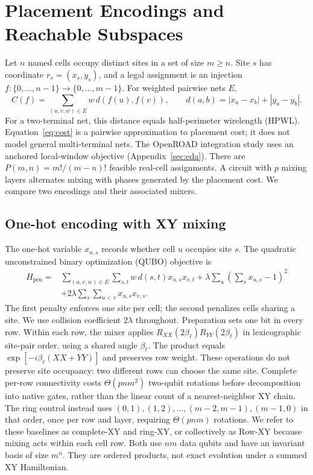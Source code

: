 \documentclass[manuscript,screen,review]{acmart}
\begin{document}
\section{Placement Encodings and Reachable Subspaces}
\label{sec:encoding}
Let $n$ named cells occupy distinct sites in a set of size $m\geq n$.
Site $s$ has coordinate $r_s=(x_s,y_s)$, and a legal assignment is an injection
$f:\{0,\ldots,n-1\}\to\{0,\ldots,m-1\}$. For weighted pairwise nets $E$,
\begin{equation}
 C(f)=\sum_{(u,v,w)\in E}w\,d(f(u),f(v)),\qquad
 d(a,b)=|x_a-x_b|+|y_a-y_b|.
 \label{eq:cost}
\end{equation}
For a two-terminal net, this distance equals half-perimeter wirelength
(HPWL). Equation~\eqref{eq:cost} is a pairwise approximation to placement
cost; it does not model general multi-terminal nets. The OpenROAD integration
study uses an anchored local-window objective (Appendix~\ref{sec:eda}).
There are $P(m,n)=m!/(m-n)!$ feasible real-cell assignments.
A circuit with $p$ mixing layers alternates mixing with phases generated by
the placement cost. We compare two encodings and their associated mixers.

\subsection{One-hot encoding with XY mixing}
The one-hot variable $x_{u,s}$ records whether cell $u$ occupies site $s$.
The quadratic unconstrained binary optimization (QUBO) objective is
\begin{align}
 H_{\mathrm{pen}}={}&\sum_{(u,v,w)\in E}\sum_{s,t} w\,d(s,t)x_{u,s}x_{v,t}
 +\lambda\sum_u\left(\sum_s x_{u,s}-1\right)^2\nonumber\\
 &+2\lambda\sum_s\sum_{u<v}x_{u,s}x_{v,s}.
 \label{eq:penalty}
\end{align}
The first penalty enforces one site per cell; the second penalizes cells
sharing a site. We use collision coefficient $2\lambda$ throughout.
Preparation sets one bit in every row. Within each row, the mixer applies
$R_{XX}(2\beta_\ell)R_{YY}(2\beta_\ell)$ in lexicographic site-pair order,
using a shared angle $\beta_\ell$. The product equals
$\exp[-i\beta_\ell(XX+YY)]$ and preserves row weight.
These operations do not preserve site occupancy: two different rows can choose the same
site. Complete per-row connectivity costs $\Theta(pnm^2)$ two-qubit rotations
before decomposition into native gates, rather than the linear count of a
nearest-neighbor XY chain.
The ring control instead uses $(0,1),(1,2),\ldots,(m-2,m-1),(m-1,0)$
in that order, once per row and layer, requiring $\Theta(pnm)$ rotations.
We refer to these baselines as complete-XY and ring-XY, or collectively
as Row-XY because mixing acts within each cell row. Both use $nm$ data
qubits and have an invariant basis of size $m^n$.
They are ordered products, not exact evolution under a summed XY Hamiltonian.
\end{document}
